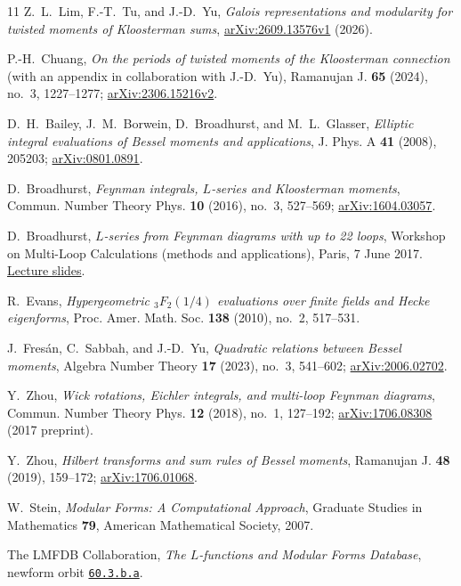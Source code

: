 \documentclass[11pt]{article}
\numberwithin{equation}{section}
\theoremstyle{definition}
\theoremstyle{remark}
\theoremstyle{plain}
\begin{document}
\begin{thebibliography}{11}
Z.~L.~Lim, F.-T.~Tu, and J.-D.~Yu,
\emph{Galois representations and modularity for twisted moments of Kloosterman sums},
\href{https://arxiv.org/abs/2609.13576v1}{arXiv:2609.13576v1} (2026).

P.-H.~Chuang,
\emph{On the periods of twisted moments of the Kloosterman connection}
(with an appendix in collaboration with J.-D.~Yu),
Ramanujan J. \textbf{65} (2024), no.~3, 1227--1277;
\href{https://arxiv.org/abs/2306.15216v2}{arXiv:2306.15216v2}.

D.~H.~Bailey, J.~M.~Borwein, D.~Broadhurst, and M.~L.~Glasser,
\emph{Elliptic integral evaluations of Bessel moments and applications},
J. Phys. A \textbf{41} (2008), 205203;
\href{https://arxiv.org/abs/0801.0891}{arXiv:0801.0891}.

D.~Broadhurst,
\emph{Feynman integrals, $L$-series and Kloosterman moments},
Commun. Number Theory Phys. \textbf{10} (2016), no.~3, 527--569;
\href{https://arxiv.org/abs/1604.03057}{arXiv:1604.03057}.

D.~Broadhurst,
\emph{$L$-series from Feynman diagrams with up to 22 loops},
Workshop on Multi-Loop Calculations (methods and applications),
Paris, 7 June 2017.
\href{https://multi-loop-2017.sciencesconf.org/data/program/Broadhurst.pdf}{Lecture slides}.

R.~Evans,
\emph{Hypergeometric ${}_3F_2(1/4)$ evaluations over finite fields and Hecke eigenforms},
Proc. Amer. Math. Soc. \textbf{138} (2010), no.~2, 517--531.

J.~Fres\'an, C.~Sabbah, and J.-D.~Yu,
\emph{Quadratic relations between Bessel moments},
Algebra Number Theory \textbf{17} (2023), no.~3, 541--602;
\href{https://arxiv.org/abs/2006.02702}{arXiv:2006.02702}.

Y.~Zhou,
\emph{Wick rotations, Eichler integrals, and multi-loop Feynman diagrams},
Commun. Number Theory Phys. \textbf{12} (2018), no.~1, 127--192;
\href{https://arxiv.org/abs/1706.08308}{arXiv:1706.08308} (2017 preprint).

Y.~Zhou,
\emph{Hilbert transforms and sum rules of Bessel moments},
Ramanujan J. \textbf{48} (2019), 159--172;
\href{https://arxiv.org/abs/1706.01068}{arXiv:1706.01068}.

W.~Stein,
\emph{Modular Forms: A Computational Approach},
Graduate Studies in Mathematics \textbf{79}, American Mathematical Society, 2007.

The LMFDB Collaboration,
\emph{The $L$-functions and Modular Forms Database},
newform orbit \href{https://www.lmfdb.org/ModularForm/GL2/Q/holomorphic/60/3/b/a/}{\texttt{60.3.b.a}}.
\end{thebibliography}
\end{document}
